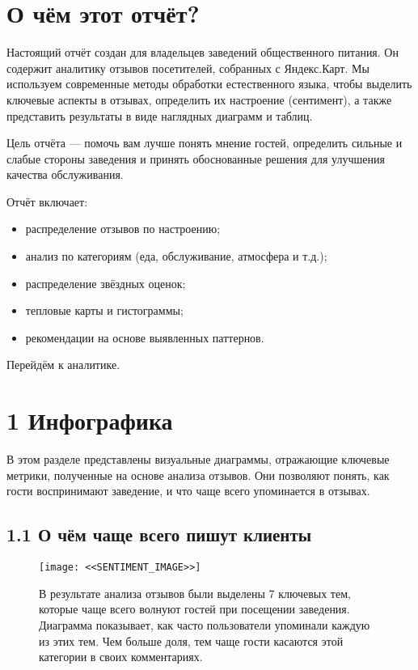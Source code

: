 \documentclass[a4paper,12pt]{extarticle}
\begin{document}
\newpage
\section*{О чём этот отчёт?}
\vspace{1em}

Настоящий отчёт создан для владельцев заведений общественного питания. Он содержит аналитику отзывов посетителей, собранных с Яндекс.Карт.
Мы используем современные методы обработки естественного языка, чтобы выделить ключевые аспекты в отзывах, определить их настроение (сентимент), а также представить результаты в виде наглядных диаграмм и таблиц.

Цель отчёта — помочь вам лучше понять мнение гостей, определить сильные и слабые стороны заведения и принять обоснованные решения для улучшения качества обслуживания.

\vspace{2em}
Отчёт включает:
\begin{itemize}
    \item распределение отзывов по настроению;
    \item анализ по категориям (еда, обслуживание, атмосфера и т.д.);
    \item распределение звёздных оценок;
    \item тепловые карты и гистограммы;
    \item рекомендации на основе выявленных паттернов.
\end{itemize}

\vspace{1em}
Перейдём к аналитике.

\newpage
\section*{1 Инфографика}
В этом разделе представлены визуальные диаграммы, отражающие ключевые метрики, полученные на основе анализа отзывов.
Они позволяют понять, как гости воспринимают заведение, и что чаще всего упоминается в отзывах.

\subsection*{1.1 О чём чаще всего пишут клиенты}

\begin{figure}[H]
    \centering
        \begin{minipage}{0.48\textwidth}
        \texttt{[image: <<SENTIMENT\_IMAGE>>]}
    \end{minipage}
    \hfill
        \begin{minipage}{0.45\textwidth}
        \small
        \vspace{1em}
    В результате анализа отзывов были выделены 7 ключевых тем, которые чаще всего волнуют гостей при посещении заведения.
    Диаграмма показывает, как часто пользователи упоминали каждую из этих тем. Чем больше доля, тем чаще гости касаются этой категории в своих комментариях.
    \end{minipage}%
\end{figure}
\end{document}
